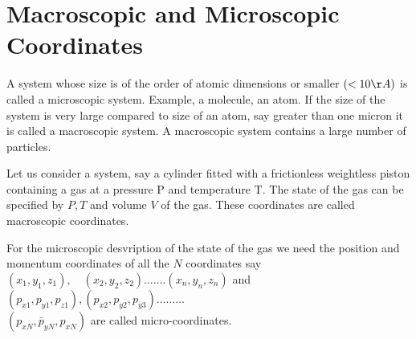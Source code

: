\section{Macroscopic and Microscopic Coordinates}
A system whose size is of the order of atomic dimensions or smaller $(<10 \AA)$ is called a microscopic system. Example, a molecule, an atom. If the size of the system is very large compared to size of an atom, say greater than one micron it is called a macroscopic system. A macroscopic system contains a large number of particles.\\
\par Let us consider a system, say a cylinder fitted with a frictionless weightless piston containing a gas at a pressure $\mathrm{P}$ and temperature $\mathrm{T}$. The state of the gas can be specified by $P, T$ and volume $V$ of the gas. These coordinates are called macroscopic coordinates.\\
\par For the microscopic desvription of the state of the gas we need the position and momentum coordinates of all the $N$ coordinates say $\left(x_{1}, y_{1}, z_{1}\right), \quad\left(x_{2}, y_{2}, z_{2}\right) \ldots \ldots .\left(x_{n}, y_{n}, z_{n}\right)$ and $\left(p_{x 1}, p_{y 1}, p_{z 1}\right),\left(p_{x 2}, p_{y 2}, p_{y 3}\right) \ldots \ldots \ldots$\\$\left(p_{x N}, \bar{p}_{y N}, p_{x N}\right)$ are called micro-coordinates.
